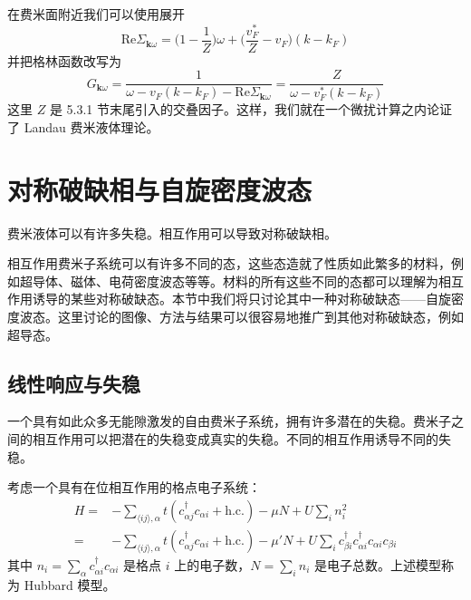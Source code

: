 在费米面附近我们可以使用展开
\begin{equation*}
\mathrm{Re}\Sigma_{\pmb{k}\omega}=\big(1-\frac{1}{Z}\big)\omega+\big(\frac{v^{*}_{F}}{Z}-v_{F}\big)(k-k_{F})
\end{equation*}
并把格林函数改写为
\begin{equation*}
G_{\pmb{k}\omega}=\frac{1}{\omega-v_{F}(k-k_{F})-\mathrm{Re}\Sigma_{\pmb{k}\omega}}=\frac{Z}{\omega-v^{*}_{F}(k-k_{F})}
\end{equation*}
这里 $Z$ 是 5.3.1 节末尾引入的交叠因子。这样，我们就在一个微扰计算之内论证了 Landau 费米液体理论。

\section{对称破缺相与自旋密度波态}

\begin{keypoints}
\item 费米液体可以有许多失稳。相互作用可以导致对称破缺相。
\end{keypoints}

相互作用费米子系统可以有许多不同的态，这些态造就了性质如此繁多的材料，例如超导体、磁体、电荷密度波态等等。材料的所有这些不同的态都可以理解为相互作用诱导的某些对称破缺态。本节中我们将只讨论其中一种对称破缺态——自旋密度波态。这里讨论的图像、方法与结果可以很容易地推广到其他对称破缺态，例如超导态。

\subsection{线性响应与失稳}

\begin{keypoints}
\item 一个具有如此众多无能隙激发的自由费米子系统，拥有许多潜在的失稳。费米子之间的相互作用可以把潜在的失稳变成真实的失稳。不同的相互作用诱导不同的失稳。
\end{keypoints}

考虑一个具有在位相互作用的格点电子系统：
\begin{align*}
H=&-\sum_{\langle ij\rangle,\alpha}t(c^{\dagger}_{\alpha j}c_{\alpha i}+\text{h.c.})-\mu N+U\sum_{i}n_{i}^{2}\\
=&-\sum_{\langle ij\rangle,\alpha}t(c^{\dagger}_{\alpha j}c_{\alpha i}+\text{h.c.})-\mu' N+U\sum_{i}c^{\dagger}_{\beta i}c^{\dagger}_{\alpha i}c_{\alpha i}c_{\beta i}\tag{5.5.1}
\end{align*}
其中 $n_{i}=\sum_{\alpha}c^{\dagger}_{\alpha i}c_{\alpha i}$ 是格点 $i$ 上的电子数，$N=\sum_{i}n_{i}$ 是电子总数。上述模型称为 Hubbard 模型。

